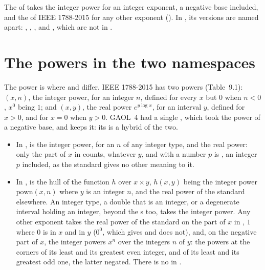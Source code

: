 \medskip
The  of  takes the integer power for an integer exponent,
a negative base included, and the  of IEEE 1788-2015 for any other
exponent (). In , its versions are named
apart: , , ,
 and , which are not in
.

\section{The powers in the two namespaces}\label{sec:pow-namespaces}
%

The power is where  and  differ.\newinvfive{}
IEEE 1788-2015 has two powers (Table~9.1): $(x,n)$, the integer
power, for an integer $n$, defined for every $x$ but $0$ when $n<0$, $x^0$
being $1$; and $(x,y)$, the real power
$e^{y\log x}$, for an interval $y$, defined for $x>0$, and for $x=0$ when
$y>0$. GAOL~4 had a single , which took the power of a negative
base, and  keeps it: its  is a hybrid of the two.

\begin{itemize}
\item In ,  is the integer power, for an
  $n$ of any integer type, and  the real power: only the part
  of $x$ in  counts, whatever $y$, and  with a
  number $p$ is , an integer $p$ included, as the standard
  gives no other meaning to it.
\item In ,  is the hull of the function $h$ over
  $x\times y$, $h(x,y)$ being the integer power $\mathrm{pown}(x,n)$ where $y$
  is an integer $n$, and the real power of the standard elsewhere.\newinvfive{}
  An integer type, a double that is an integer, or a degenerate interval
   holding an integer, beyond the s too, takes the integer
  power. Any other exponent takes the real power of the standard on the part of
  $x$ in , $1$ where $0$ is in $x$ and in $y$ ($0^0$, which
   gives and  does not), and, on the negative part of $x$,
  the integer powers $x^n$ over the integers $n$ of $y$: the powers at the
  corners of its least and its greatest even integer, and of its least and its
  greatest odd one, the latter negated. There is no  in .
\end{itemize}

